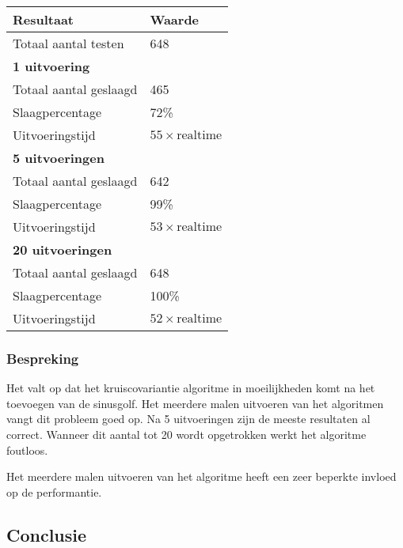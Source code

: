 \begin{tabular}{ l  l}
	\hline
	\textbf{Resultaat} & \textbf{Waarde} \\
	\hline
	Totaal aantal testen & 648 \\
	\textbf{1 uitvoering} & \\
	\hspace{0.5cm}Totaal aantal geslaagd & 465 \\
	\hspace{0.5cm}Slaagpercentage & 72\% \\
	\hspace{0.5cm}Uitvoeringstijd & $55 \times \textrm{realtime}$ \\
	\textbf{5 uitvoeringen} & \\
	\hspace{0.5cm}Totaal aantal geslaagd & 642 \\
	\hspace{0.5cm}Slaagpercentage & 99\% \\
	\hspace{0.5cm}Uitvoeringstijd & $53 \times \textrm{realtime}$ \\
	\textbf{20 uitvoeringen} & \\
	\hspace{0.5cm}Totaal aantal geslaagd & 648 \\
	\hspace{0.5cm}Slaagpercentage & 100\% \\
	\hspace{0.5cm}Uitvoeringstijd & $52 \times \textrm{realtime}$ \\
\end{tabular}

\subsubsection{Bespreking}

Het valt op dat het kruiscovariantie algoritme in moeilijkheden komt na het toevoegen van de sinusgolf. Het meerdere malen uitvoeren van het algoritmen vangt dit probleem goed op. Na 5 uitvoeringen zijn de meeste resultaten al correct. Wanneer dit aantal tot 20 wordt opgetrokken werkt het algoritme foutloos. 

Het meerdere malen uitvoeren van het algoritme heeft een zeer beperkte invloed op de performantie.

\subsection{Conclusie}

